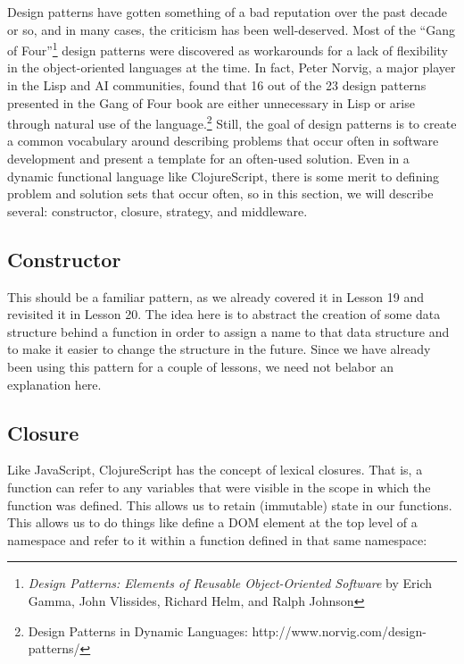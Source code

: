 \documentclass[10pt,twoside,openright]{memoir}
\begin{document}
Design patterns have gotten something of a bad reputation over the past
decade or so, and in many cases, the criticism has been well-deserved.
Most of the ``Gang of Four''\footnote{\emph{Design Patterns: Elements of
  Reusable Object-Oriented Software} by Erich Gamma, John Vlissides,
  Richard Helm, and Ralph Johnson} design patterns were discovered as
workarounds for a lack of flexibility in the object-oriented languages
at the time. In fact, Peter Norvig, a major player in the Lisp and AI
communities, found that 16 out of the 23 design patterns presented in
the Gang of Four book are either unnecessary in Lisp or arise through
natural use of the language.\footnote{Design
  Patterns in Dynamic Languages: http://www.norvig.com/design-patterns/} Still, the goal of design patterns is
to create a common vocabulary around describing problems that occur
often in software development and present a template for an often-used
solution. Even in a dynamic functional language like ClojureScript,
there is some merit to defining problem and solution sets that occur
often, so in this section, we will describe several: constructor,
closure, strategy, and middleware.

\subsection{Constructor}

This should be a familiar pattern, as we already covered it in
Lesson 19 and revisited it in Lesson 20. The
idea here is to abstract the creation of some data structure behind a
function in order to assign a name to that data structure and to make it
easier to change the structure in the future. Since we have already been
using this pattern for a couple of lessons, we need not belabor an
explanation here.


\subsection{Closure}

Like JavaScript, ClojureScript has the concept of lexical closures. That
is, a function can refer to any variables that were visible in the scope
in which the function was defined. This allows us to retain (immutable)
state in our functions. This allows us to do things like define a DOM
element at the top level of a namespace and refer to it within a
function defined in that same namespace:
\end{document}
